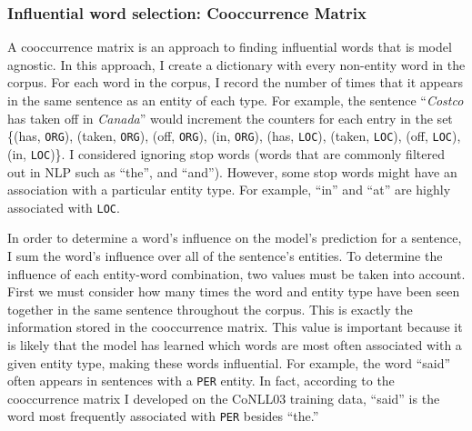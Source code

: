 \subsubsection{Influential word selection: Cooccurrence Matrix}
A cooccurrence matrix is an approach to finding influential words that is model agnostic. In this approach, I create a dictionary with every non-entity word in the corpus. For each word in the corpus, I record the number of times that it appears in the same sentence as an entity of each type. For example, the sentence ``\textit{Costco} has taken off in \textit{Canada}'' would increment the counters for each entry in the set  \{(has, \texttt{ORG}), (taken, \texttt{ORG}), (off, \texttt{ORG}), (in, \texttt{ORG}), (has, \texttt{LOC}), (taken, \texttt{LOC}), (off, \texttt{LOC}), (in, \texttt{LOC})\}. I considered ignoring stop words (words that are commonly filtered out in NLP such as ``the'', and ``and''). However, some stop words might have an association with a particular entity type. For example, ``in'' and ``at'' are highly associated with \texttt{LOC}. 

In order to determine a word's influence on the model's prediction for a sentence, I sum the word's influence over all of the sentence's entities. To determine the influence of each entity-word combination, two values must be taken into account. First we must consider how many times the word and entity type have been seen together in the same sentence throughout the corpus. This is exactly the information stored in the cooccurrence matrix. This value is important because it is likely that the model has learned which words are most often associated with a given entity type, making these words influential. For example, the word ``said'' often appears in sentences with a \texttt{PER} entity. In fact, according to the cooccurrence matrix I developed on the CoNLL03 training data, ``said'' is the word most frequently associated with \texttt{PER} besides ``the.'' 

